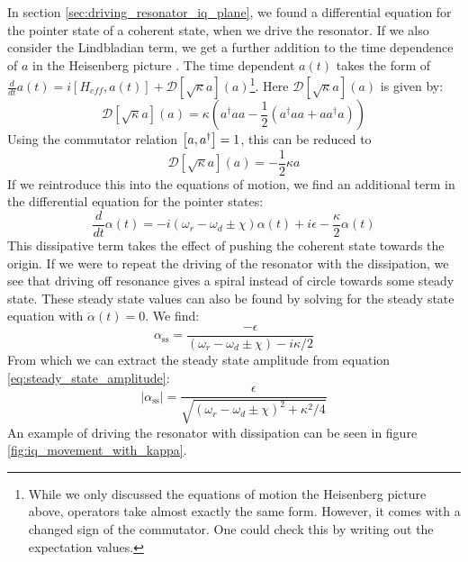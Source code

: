 In section \ref{sec:driving_resonator_iq_plane}, we found a differential equation for the pointer state of a coherent state, when we drive the resonator. If we also consider the Lindbladian term, we get a further addition to the time dependence of $a$ in the Heisenberg picture . The time dependent $a(t)$ takes the form of $\frac{d}{dt}a(t) = i[H_{eff}, a(t)] +  \mathcal{D}[\sqrt{\kappa}a](a)$\footnote{While we only discussed the equations of motion the Heisenberg picture above, operators take almost exactly the same form. However, it comes with a changed sign of the commutator. One could check this by writing out the expectation values.}. Here $\mathcal{D}[\sqrt{\kappa}a](a)$ is given by:
\begin{equation}
    \mathcal{D}[\sqrt{\kappa}a](a) = \kappa \left(a^\dagger a a -\frac12 \left(a^\dagger a a + a a^\dagger a \right) \right)
\end{equation}
Using the commutator relation $\comm{a}{a^\dagger} = 1$, this can be reduced to
\begin{equation}
    \mathcal{D}[\sqrt{\kappa}a](a) = -\frac{1}{2}\kappa a 
\end{equation}
If we reintroduce this into the equations of motion, we find an additional term in the differential equation for the pointer states:
\begin{equation}\label{eq:resonator_movement}
    \frac{d}{dt}\alpha(t) = - i \left(\omega_r - \omega_d \pm \chi\right) \alpha(t) + i\epsilon - \frac{\kappa}{2}\alpha(t) 
\end{equation}
This dissipative term takes the effect of pushing the coherent state towards the origin. If we were to repeat the driving of the resonator with the dissipation, we see that driving off resonance gives a spiral instead of circle towards some steady state. These steady state values can also be found by solving for the steady state equation with $\dot{\alpha}(t) = 0$. We find:
\begin{equation}
    \alpha_{\text{ss}} = \frac{-\epsilon}{(\omega_r - \omega_d \pm \chi) - i \kappa / 2}
\end{equation}
From which we can extract the steady state amplitude from equation \ref{eq:steady_state_amplitude}:
\begin{equation}\label{eq:steady_state_amplitude}
    |\alpha_{\text{ss}}| = \frac{\epsilon}{\sqrt{(\omega_r - \omega_d \pm \chi)^2 + \kappa^2 / 4}}
\end{equation}
An example of driving the resonator with dissipation can be seen in figure \ref{fig:iq_movement_with_kappa}.

